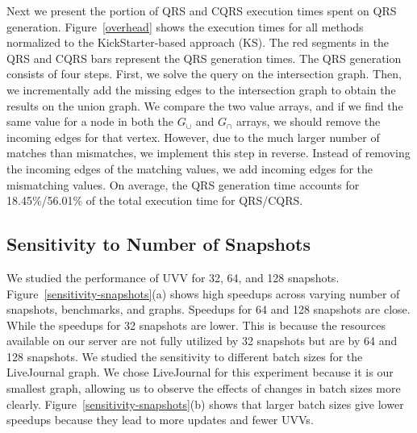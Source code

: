 Next we present the portion of QRS and CQRS execution times spent on QRS generation. Figure~\ref{overhead} shows the execution times for all methods normalized to the KickStarter-based approach (KS). The red segments in the QRS and CQRS bars represent the QRS generation times. 
The QRS generation consists of four steps. First, we solve the query on the intersection graph. Then, we incrementally add the missing edges to the intersection graph to obtain the results on the union graph. We compare the two value arrays, and if we find the same value for a node in both the $G_{\cup}$ and $G_{\cap}$ arrays, we should remove the incoming edges for that vertex. However, due to the much larger number of matches than mismatches, we implement this step in reverse. Instead of removing the incoming edges of the matching values, we add incoming edges for the mismatching values. On average, the QRS generation time accounts for 18.45\%/56.01\% of the total execution time for QRS/CQRS.




\subsection{Sensitivity to Number of Snapshots}
We studied the performance of UVV for 32, 64, and 128 snapshots. Figure~\ref{sensitivity-snapshots}(a) shows high speedups across varying number of snapshots, benchmarks, and graphs. Speedups for 64 and 128 snapshots are close. While the speedups for 32 snapshots are lower. This is because the resources available on our server are not fully utilized by 32 snapshots but are by 64 and 128 snapshots. We studied the sensitivity to different batch sizes for the LiveJournal graph. We chose LiveJournal for this experiment because it is our smallest graph, allowing us to observe the effects of changes in batch sizes more clearly. Figure~\ref{sensitivity-snapshots}(b) shows that larger batch sizes give lower speedups because they lead to more updates and fewer UVVs. 


